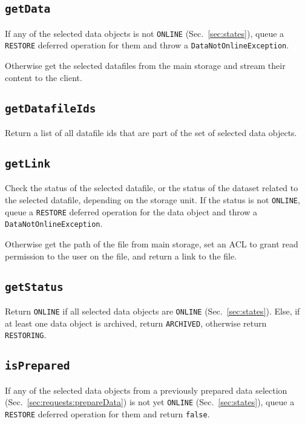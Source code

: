 \documentclass[paper=a4]{scrartcl}
\begin{document}
\subsection{\texttt{getData}}
\label{sec:requests:getdata}

If any of the selected data objects is not \texttt{ONLINE}
(Sec.~\ref{sec:states}), queue a \texttt{RESTORE} deferred operation
for them and throw a \texttt{DataNotOnlineException}.

Otherwise get the selected datafiles from the main storage and
stream their content to the client.

\subsection{\texttt{getDatafileIds}}

Return a list of all datafile ids that are part of the set of
selected data objects.

\subsection{\texttt{getLink}}
\label{sec:requests:getlink}

Check the status of the selected datafile, or the status of the
dataset related to the selected datafile, depending on the storage
unit.  If the status is not \texttt{ONLINE}, queue a \texttt{RESTORE}
deferred operation for the data object and throw a
\texttt{DataNotOnlineException}.

Otherwise get the path of the file from main storage, set an ACL to
grant read permission to the user on the file, and return a link to
the file.

\subsection{\texttt{getStatus}}
\label{sec:requests:getStatus}

Return \texttt{ONLINE} if all selected data objects are
\texttt{ONLINE} (Sec.~\ref{sec:states}).  Else, if at least one data
object is archived, return \texttt{ARCHIVED}, otherwise return
\texttt{RESTORING}.

\subsection{\texttt{isPrepared}}

If any of the selected data objects from a previously prepared
data selection (Sec.~\ref{sec:requests:prepareData}) is not yet
\texttt{ONLINE} (Sec.~\ref{sec:states}), queue a \texttt{RESTORE}
deferred operation for them and return \texttt{false}.
\end{document}
